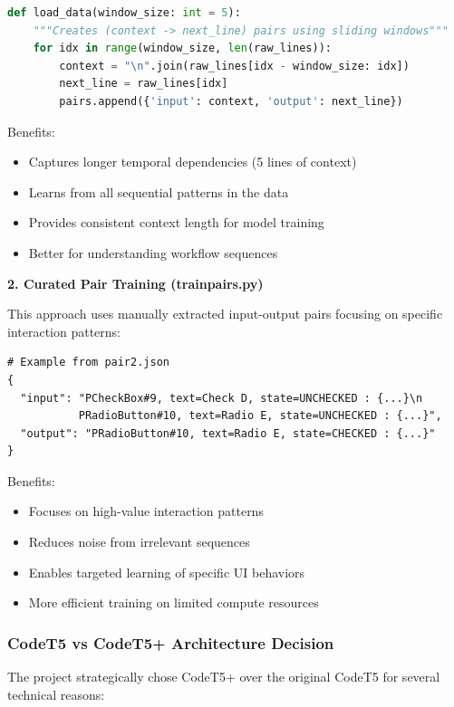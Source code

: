 \documentclass[12pt,a4paper]{article}
\begin{document}
\begin{lstlisting}[caption=Sliding Window Training Logic, language=Python]
def load_data(window_size: int = 5):
    """Creates (context -> next_line) pairs using sliding windows"""
    for idx in range(window_size, len(raw_lines)):
        context = "\n".join(raw_lines[idx - window_size: idx])
        next_line = raw_lines[idx]
        pairs.append({'input': context, 'output': next_line})
\end{lstlisting}

Benefits:
\begin{itemize}
\item Captures longer temporal dependencies (5 lines of context)
\item Learns from all sequential patterns in the data
\item Provides consistent context length for model training
\item Better for understanding workflow sequences
\end{itemize}

\textbf{2. Curated Pair Training (trainpairs.py)}

This approach uses manually extracted input-output pairs focusing on specific interaction patterns:

\begin{lstlisting}[caption=Pair-Based Training Structure]
# Example from pair2.json
{
  "input": "PCheckBox#9, text=Check D, state=UNCHECKED : {...}\n
           PRadioButton#10, text=Radio E, state=UNCHECKED : {...}",
  "output": "PRadioButton#10, text=Radio E, state=CHECKED : {...}"
}
\end{lstlisting}

Benefits:
\begin{itemize}
\item Focuses on high-value interaction patterns
\item Reduces noise from irrelevant sequences
\item Enables targeted learning of specific UI behaviors
\item More efficient training on limited compute resources
\end{itemize}

\subsubsection{CodeT5 vs CodeT5+ Architecture Decision}

The project strategically chose CodeT5+ over the original CodeT5 for several technical reasons:
\end{document}
